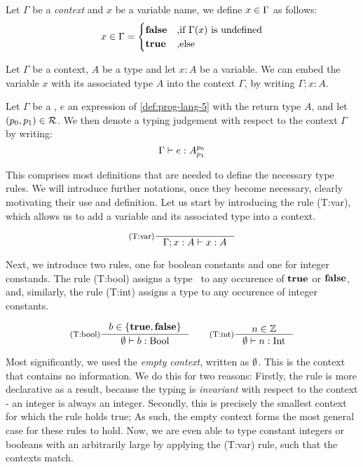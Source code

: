 \begin{definition}\label{def:in-context}
   Let \(\Gamma\) be a \emph{context} and \(x\) be a variable name, we define \(x \in \Gamma\) as follows:
   \[
      x \in \Gamma =
      \begin{cases}
	 \mathbf{false}	     & \text{,if } \Gamma(x) \text{ is undefined}\\
	 \mathbf{true}	     & \text{,else}
      \end{cases}
   \]
\end{definition}

\begin{definition}\label{def:context-augment}
   Let \(\Gamma\) be a context, \(A\) be a type and let \(x : A\) be a variable. We can embed the variable \(x\) with its associated type \(A\) into the context \(\Gamma\),  by writing \(\Gamma ; x:A\).
\end{definition}

\begin{definition}\label{def:type-judgement-context}
   Let \(\Gamma\) be a , \(e\) an expression of \cref{def:prog-lang-5} with the return type \(A\), and let \((p_0, p_1) \in \mathcal{R}\). We then denote a typing judgement with respect to the context \(\Gamma\) by writing:
   \[
      \Gamma \vdash e : A ^{p_0}_{p_1}
   \]
\end{definition}

This comprises most definitions that are needed to define the necessary type rules. We will introduce further notations, once they become necessary, clearly motivating their use and definition. Let us start by introducing the rule (T:var), which allows us to add a variable and its associated type into a context.

\[
   \inference[(T:var)]
   {}
   {\typing{\Gamma; x: A}{x}{A}}
\]

Next, we introduce two rules, one for boolean constants and one for integer constands. The rule (T:bool) assigns a type \bool~to any occurence of \(\mathbf{true}\) or \(\mathbf{false}\), and, similarly, the rule (T:int) assigns a type \typeint to any occurence of integer constants.

\[
   \inference[(T:bool)]
   {b \in \{\true, \false\}}
   {\typing{\emptycontext}{b}{\text{\bool}}}%
   \qquad
   \inference[(T:int)]
   {n \in \mathbb{Z}}
   {\typing{\emptycontext}{n}{\text{\typeint}}}
\]

Most significantly, we used the \emph{empty context}, written as \(\emptyset\). This is the context that contains no information. We do this for two reasons: Firstly, the rule is more declarative as a result, because the typing is \emph{invariant} with respect to the context - an integer is always an integer. Secondly, this is precisely the smallest context for which the rule holds true; As such, the empty context forms the most general case for these rules to hold. Now, we are even able to type constant integers or booleans with an arbitrarily large  by applying the (T:var) rule, such that the contexts match. 

